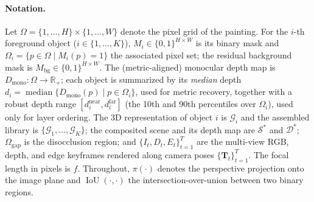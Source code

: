 \paragraph{Notation.}
Let $\Omega = \{1,\dots,H\}\times\{1,\dots,W\}$ denote the pixel grid of
the painting. For the $i$-th foreground object
($i \in \{1,\dots,K\}$), $M_i \in \{0,1\}^{H\times W}$ is its binary
mask and $\Omega_i = \{p \in \Omega \mid M_i(p) = 1\}$ the associated
pixel set; the residual background mask is
$M_{\mathrm{bg}} \in \{0,1\}^{H\times W}$. The (metric-aligned)
monocular depth map is $D_{\mathrm{mono}} : \Omega \to \mathbb{R}_{+}$;
each object is summarized by its \emph{median} depth
$d_i = \operatorname{median}\{D_{\mathrm{mono}}(p) \mid p \in
\Omega_i\}$, used for metric recovery, together with a robust depth
range $[d_i^{\mathrm{near}}, d_i^{\mathrm{far}}]$ (the 10th and 90th
percentiles over $\Omega_i$), used only for layer ordering. The 3D
representation of object $i$ is $\mathcal{G}_i$ and the assembled
library is $\{\mathcal{G}_1,\dots,\mathcal{G}_K\}$; the composited
scene and its depth map are $\mathcal{S}^{*}$ and $\mathcal{D}^{*}$;
$\Omega_{\mathrm{gap}}$ is the disocclusion region; and
$\{I_t, D_t, E_t\}_{t=1}^{T}$ are the multi-view RGB, depth, and edge
keyframes rendered along camera poses $\{\mathbf{T}_t\}_{t=1}^{T}$. The
focal length in pixels is $f$. Throughout, $\pi(\cdot)$ denotes the
perspective projection onto the image plane and
$\operatorname{IoU}(\cdot,\cdot)$ the intersection-over-union between
two binary regions.

